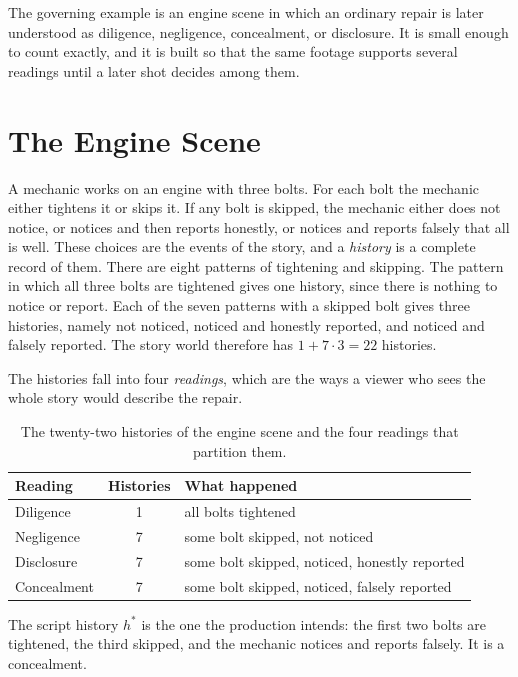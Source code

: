 \documentclass[11pt,twoside,openright]{book}
\theoremstyle{plain}
\theoremstyle{definition}
\theoremstyle{remark}
\begin{document}
The governing example is an engine scene in which an ordinary repair is later understood as diligence, negligence, concealment, or disclosure. It is small enough to count exactly, and it is built so that the same footage supports several readings until a later shot decides among them.

\section{The Engine Scene}\label{sec:engine}

A mechanic works on an engine with three bolts. For each bolt the mechanic either tightens it or skips it. If any bolt is skipped, the mechanic either does not notice, or notices and then reports honestly, or notices and reports falsely that all is well. These choices are the events of the story, and a \emph{history} is a complete record of them. There are eight patterns of tightening and skipping. The pattern in which all three bolts are tightened gives one history, since there is nothing to notice or report. Each of the seven patterns with a skipped bolt gives three histories, namely not noticed, noticed and honestly reported, and noticed and falsely reported. The story world therefore has $1+7\cdot3=22$ histories.

The histories fall into four \emph{readings}, which are the ways a viewer who sees the whole story would describe the repair.

\begin{table}[ht]
\centering
\begin{tabular}{@{}lcl@{}}
\toprule
Reading & Histories & What happened\\
\midrule
Diligence & 1 & all bolts tightened\\
Negligence & 7 & some bolt skipped, not noticed\\
Disclosure & 7 & some bolt skipped, noticed, honestly reported\\
Concealment & 7 & some bolt skipped, noticed, falsely reported\\
\bottomrule
\end{tabular}
\caption{The twenty-two histories of the engine scene and the four readings that partition them.}\label{tab:readings}
\end{table}

The script history $h^\ast$ is the one the production intends: the first two bolts are tightened, the third skipped, and the mechanic notices and reports falsely. It is a concealment.
\end{document}
